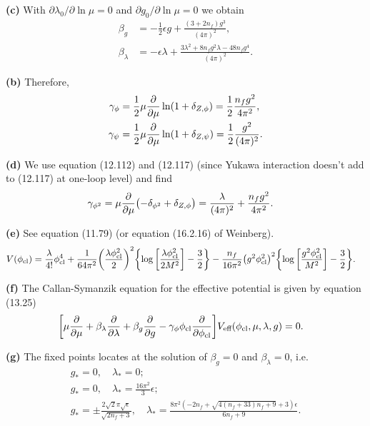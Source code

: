 \documentclass{article}
\makeatletter
\newcommand*{\shifttext}[1]{%
  \settowidth{\@tempdima}{#1}%
  \hspace{-\@tempdima}#1%
}
\newcommand{\plabel}[1]{%
\shifttext{\textbf{#1}\quad}%
}
\makeatother
\begin{document}
\plabel{(c)}%
With $\partial \lambda_0/\partial \ln \mu = 0$ and $\partial g_0/\partial \ln \mu = 0$ we obtain
\begin{align*}
    \beta_g &= -\frac{1}{2} \epsilon g + \frac{(3+2n_f)g^3}{(4\pi)^2}, \\
    \beta_\lambda &= -\epsilon \lambda + \frac{3\lambda^2 + 8 n_f g^2\lambda - 48n_f g^4}{(4\pi)^2}.
\end{align*}

\plabel{(b)}%
Therefore,
\begin{align*}
    \gamma_\phi &= \frac{1}{2}\mu \pdv{\mu} \ln(1+\delta_{Z,\phi}) = \frac{1}{2}\frac{n_f g^2}{4\pi^2}, \\
    \gamma_\psi &= \frac{1}{2}\mu \pdv{\mu} \ln(1+\delta_{Z,\psi}) = \frac{1}{2}\frac{g^2}{(4\pi)^2}.
\end{align*}

\plabel{(d)}%
We use equation (12.112) and (12.117) (since Yukawa interaction doesn't add to (12.117) at one-loop level) and find
\begin{align*}
    \gamma_{\phi^2} &= \mu \pdv{\mu}\qty(-\delta_{\phi^2} + \delta_{Z,\phi}) = \frac{\lambda}{(4\pi)^2} + \frac{n_f g^2}{4\pi^2}.
\end{align*}

\plabel{(e)}%
See equation (11.79) (or equation (16.2.16) of Weinberg).
\begin{align*}
    V(\phi_{\text{cl}}) &= \frac{\lambda}{4!}\phi_{\text{cl}}^4 + \frac{1}{64\pi^2}\qty(\frac{\lambda \phi_{\text{cl}}^2}{2})^2 \qty{\log\qty[\frac{\lambda\phi_{\text{cl}}^2}{2M^2}]-\frac{3}{2}} - \frac{n_f}{16\pi^2}  \qty(g^2\phi_{\text{cl}}^2)^2 \qty{\log\qty[\frac{g^2 \phi_{\text{cl}}^2}{M^2}]-\frac{3}{2}}.
\end{align*}

\plabel{(f)}%
The Callan-Symanzik equation for the effective potential is given by equation (13.25)
\begin{align*}
    \qty[\mu\pdv{\mu} + \beta_\lambda \pdv{\lambda} + \beta_g \pdv{g} - \gamma_{\phi} \phi_{\text{cl}} \pdv{\phi_{\text{cl}}}] V_{\text{eff}}(\phi_{\text{cl}},\mu,\lambda,g) &= 0.
\end{align*}

\plabel{(g)}%
The fixed points locates at the solution of $\beta_g = 0$ and $\beta_\lambda = 0$, i.e.
\begin{gather*}
    g_*=0,\quad \lambda_*=0; \\
    g_*=0,\quad \lambda_*=\frac{16\pi^2}{3}\epsilon; \\
    g_*=\pm \frac{2\sqrt{2}\pi \sqrt{\epsilon}}{\sqrt{2n_f+3}},\quad \lambda_*=\frac{8 \pi ^2 \left(-2 n_f+\sqrt{4 (n_f+33) n_f+9}+3\right) \epsilon }{6 n_f+9}.
\end{gather*}
\end{document}

